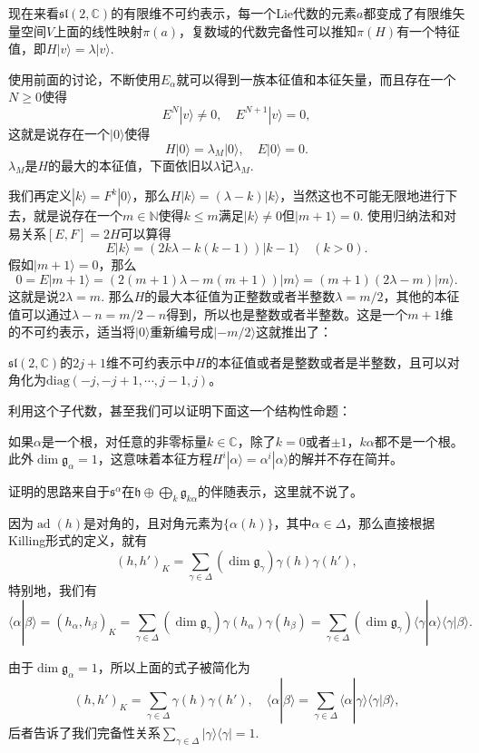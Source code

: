 \documentclass[9pt]{extarticle}
\newcommand{\cc}{\mathbb{C}}
\newcommand{\lag}{{\mathfrak{g}}}
\DeclareMathOperator{\ad}{ad}
\begin{document}
\para 现在来看$\mathfrak{sl}(2,\cc)$的有限维不可约表示，每一个Lie代数的元素$a$都变成了有限维矢量空间$V$上面的线性映射$\pi(a)$，复数域的代数完备性可以推知$\pi(H)$有一个特征值，即$H|v\rangle=\lambda |v\rangle$.

使用前面的讨论，不断使用$E_\alpha$就可以得到一族本征值和本征矢量，而且存在一个$N\geq 0$使得
\[
	E^N|v\rangle\neq 0,\quad E^{N+1}|v\rangle =0,
\]
这就是说存在一个$|0\rangle$使得
\[
	H|0\rangle =\lambda_M |0\rangle,\quad E|0\rangle =0.
\]
$\lambda_M$是$H$的最大的本征值，下面依旧以$\lambda$记$\lambda_M$.

我们再定义$|k\rangle=F^k|0\rangle$，那么$H|k\rangle=(\lambda-k) |k\rangle$，当然这也不可能无限地进行下去，就是说存在一个$m\in \mathbb{N}$使得$k\leq m$满足$|k\rangle\neq 0$但$|m+1\rangle=0$. 使用归纳法和对易关系$[E,F]=2H$可以算得
\[
E|k\rangle=(2k\lambda -k(k-1)) |k-1\rangle\quad (k>0).
\]
假如$|m+1\rangle =0$，那么
\[
0=E|m+1\rangle=(2(m+1)\lambda -m(m+1)) |m\rangle =(m+1)(2\lambda-m)|m\rangle.
\]
这就是说$2\lambda=m$. 那么$H$的最大本征值为正整数或者半整数$\lambda=m/2$，其他的本征值可以通过$\lambda-n=m/2-n$得到，所以也是整数或者半整数。这是一个$m+1$维的不可约表示，适当将$|0\rangle$重新编号成$|-m/2\rangle$这就推出了：

\pro $\mathfrak{sl}(2,\cc)$的$2j+1$维不可约表示中$H$的本征值或者是整数或者是半整数，且可以对角化为$\mathrm{diag}(-j,-j+1,\cdots,j-1,j)$。

利用这个子代数，甚至我们可以证明下面这一个结构性命题：

\pro 如果$\alpha$是一个根，对任意的非零标量$k\in \cc$，除了$k=0$或者$\pm 1$，$k\alpha$都不是一个根。此外$\dim \lag_{\alpha}=1$，这意味着本征方程$H^i|\alpha\rangle = \alpha^i|\alpha\rangle$的解并不存在简并。

证明的思路来自于$\mathfrak{s}^\alpha$在$\mathfrak{h} \oplus \bigoplus_k \lag_{k\alpha}$的伴随表示，这里就不说了。

\para 因为$\ad(h)$是对角的，且对角元素为$\{\alpha(h)\}$，其中$\alpha\in\Delta$，那么直接根据Killing形式的定义，就有
\[
	(h,h')_K=\sum_{\gamma \in \Delta}(\dim \lag_\gamma)\gamma(h)\gamma(h'),
\]
特别地，我们有
\[
	\langle \alpha|\beta \rangle=(h_\alpha,h_\beta)_K=\sum_{\gamma \in \Delta}(\dim \lag_\gamma)\gamma(h_\alpha)\gamma(h_\beta)=\sum_{\gamma \in \Delta}(\dim \lag_\gamma)\langle \gamma|\alpha\rangle\langle \gamma|\beta\rangle.
\]

由于$\dim \lag_{\alpha}=1$，所以上面的式子被简化为
\[
	(h,h')_K=\sum_{\gamma \in \Delta}\gamma(h)\gamma(h'),\quad \langle \alpha|\beta \rangle=\sum_{\gamma \in \Delta}\langle \alpha|\gamma\rangle\langle \gamma|\beta\rangle,
\]
后者告诉了我们完备性关系$\sum_{\gamma\in \Delta}|\gamma\rangle\langle \gamma|=1$.
\end{document}
